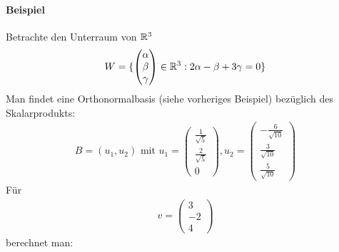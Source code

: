 \paragraph{Beispiel}
Betrachte den Unterraum von $\mathbb{R}^3$
\begin{align}
W = \{ \begin{pmatrix} \alpha \\ \beta \\ \gamma \end{pmatrix} \in \mathbb{R}^3: 2\alpha - \beta + 3 \gamma = 0\}
\end{align}
Man findet eine Orthonormalbasis (siehe vorheriges Beispiel) bezüglich des Skalarprodukts:
\begin{align}
B = (u_1, u_2) \text{ mit } u_1 = \begin{pmatrix} \frac{1}{\sqrt{5}} \\ \frac{2}{\sqrt{5}} \\ 0\end{pmatrix}, u_2 = \begin{pmatrix} -\frac{6}{\sqrt{10}} \\ \frac{3}{\sqrt{10}} \\ \frac{5}{\sqrt{10}} \end{pmatrix}
\end{align}
Für 
\begin{align}
v = \begin{pmatrix} 3 \\ -2 \\ 4 \end{pmatrix}
\end{align}
berechnet man:
